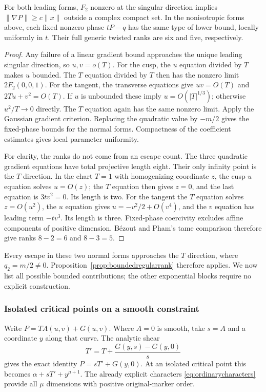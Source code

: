 \begin{lemma}\label{lem:cusptangentgate}
For both leading forms, $F_2$ nonzero at the singular direction
implies $\|\nabla P\|\ge c\|x\|$ outside a complex compact set.
In the nonisotropic forms above, each fixed nonzero phase
$tP-q$ has the same type of lower bound, locally uniformly in
$t$. Their full generic twisted ranks are six and five,
respectively.
\end{lemma}
\begin{proof}
Any failure of a linear gradient bound approaches the unique
leading singular direction, so $u,v=o(T)$. For the cusp,
the $u$ equation divided by $T$ makes $u$ bounded. The $T$
equation divided by $T$ then has the nonzero limit $2F_2(0,0,1)$.
For the tangent, the transverse equations give
$uv=O(T)$ and $2Tu+v^2=O(T)$. If $u$ is unbounded these imply
$u=O(|T|^{1/3})$; otherwise $u^2/T\to0$ directly. The $T$
equation again has the same nonzero limit. Apply the Gaussian
gradient criterion. Replacing the quadratic value by $-m/2$
gives the fixed-phase bounds for the normal forms. Compactness
of the coefficient estimates gives local parameter uniformity.

For clarity, the ranks do not come from an escape count. The
three quadratic gradient equations have total projective length
eight. Their only infinity point is the $T$ direction. In the
chart $T=1$ with homogenizing coordinate $z$, the cusp $u$
equation solves $u=O(z)$; the $T$ equation then gives $z=0$,
and the last equation is $3tv^2=0$. Its length is two. For
the tangent the $T$ equation solves $z=O(u^2)$, the $u$ equation
gives $u=-v^2/2+O(v^4)$, and the $v$ equation has leading term
$-tv^3$. Its length is three. Fixed-phase coercivity excludes
affine components of positive dimension. B\'ezout and Pham's
tame comparison therefore give ranks $8-2=6$ and $8-3=5$.
\end{proof}

Every escape in these two normal forms approaches the $T$
direction, where $q_2=m/2\ne0$. Proposition~\ref{prop:boundedregularrank}
therefore applies. We now list all possible bounded contributions;
the other exponential blocks require no explicit construction.

\subsubsection*{Isolated critical points on a smooth constraint}

Write $P=T A(u,v)+G(u,v)$. Where $A=0$ is smooth, take $s=A$
and a coordinate $y$ along that curve. The analytic shear
\[
 T'=T+\frac{G(y,s)-G(y,0)}s
\]
gives the exact identity $P=sT'+G(y,0)$. At an isolated critical
point this becomes $\alpha+sT'+y^{\mu+1}$. The already explicit
characters \eqref{eq:ordinarycharacters} provide all $\mu$
dimensions with positive original-marker order.

